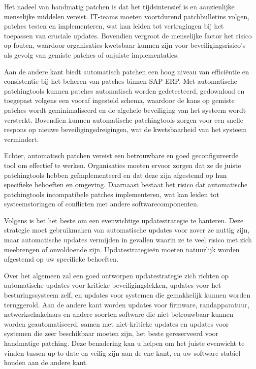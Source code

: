 Het nadeel van handmatig patchen is dat het tijdsintensief is en aanzienlijke menselijke middelen vereist. IT-teams moeten voortdurend patchbulletins volgen, patches testen en implementeren, wat kan leiden tot vertragingen bij het toepassen van cruciale updates. Bovendien vergroot de menselijke factor het risico op fouten, waardoor organisaties kwetsbaar kunnen zijn voor beveiligingsrisico's als gevolg van gemiste patches of onjuiste implementaties.

Aan de andere kant biedt automatisch patchen een hoog niveau van efficiëntie en consistentie bij het beheren van patches binnen SAP ERP. Met automatische patchingtools kunnen patches automatisch worden gedetecteerd, gedownload en toegepast volgens een vooraf ingesteld schema, waardoor de kans op gemiste patches wordt geminimaliseerd en de algehele beveiliging van het systeem wordt versterkt. Bovendien kunnen automatische patchingtools zorgen voor een snelle respons op nieuwe beveiligingsdreigingen, wat de kwetsbaarheid van het systeem vermindert. 

Echter, automatisch patchen vereist een betrouwbare en goed geconfigureerde tool om effectief te werken. Organisaties moeten ervoor zorgen dat ze de juiste patchingtools hebben geïmplementeerd en dat deze zijn afgestemd op hun specifieke behoeften en omgeving. Daarnaast bestaat het risico dat automatische patchingtools incompatibele patches implementeren, wat kan leiden tot systeemstoringen of conflicten met andere softwarecomponenten.

Volgens \textcite{Tozzi2017} is het het beste om een evenwichtige updatestrategie te hanteren. Deze strategie moet gebruikmaken van automatische updates voor zover ze nuttig zijn, maar automatische updates vermijden in gevallen waarin ze te veel risico met zich meebrengen of onvoldoende zijn. Updatestrategieën moeten natuurlijk worden afgestemd op uw specifieke behoeften. 

Over het algemeen zal een goed ontworpen updatestrategie zich richten op automatische updates voor kritieke beveiligingslekken, updates voor het besturingssysteem zelf, en updates voor systemen die gemakkelijk kunnen worden teruggerold. Aan de andere kant worden updates voor firmware, randapparatuur, netwerkschakelaars en andere soorten software die niet betrouwbaar kunnen worden geautomatiseerd, samen met niet-kritieke updates en updates voor systemen die zeer beschikbaar moeten zijn, het beste gereserveerd voor handmatige patching. Deze benadering kan u helpen om het juiste evenwicht te vinden tussen up-to-date en veilig zijn aan de ene kant, en uw software stabiel houden aan de andere kant.

